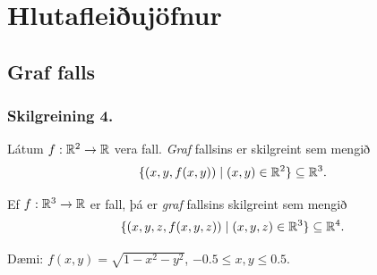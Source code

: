 
\theoremstyle{definition}
\newtheorem{exercise}[theorem]{}





\newbox\mytempbox
\newdimen\mytempdimen

\newcommand\includegraphicscopyright[3][]{%
  \leavevmode\vbox{\vskip3pt\raggedright\setbox\mytempbox=\hbox{\texttt{[image: \#2]}}%
    \mytempdimen=\wd\mytempbox\box\mytempbox\par\vskip1pt%
    \fontsize{3}{3.5}\selectfont{\color{black!25}{\vbox{\hsize=\mytempdimen#3}}}\vskip3pt%
}}

\newenvironment{colortabular}[1]{\medskip\rowcolors[]{1}{blue!20}{blue!10}\tabular{#1}\rowcolor{blue!40}}{\endtabular\medskip}

\def\equad{\leavevmode\hbox{}\quad}

\newenvironment{greencolortabular}[1]
{\medskip\rowcolors[]{1}{green!50!black!20}{green!50!black!10}%
  \tabular{#1}\rowcolor{green!50!black!40}}%
{\endtabular\medskip}





\section{Hlutafleiðujöfnur}


\subsection{Graf falls} 

\subsubsection{Skilgreining 4.}
Látum $f:{\mathbb R}^2\rightarrow {\mathbb R}$ vera fall.  {\em Graf} fallsins er skilgreint sem mengið 
$$\{(x,y,f(x,y))\mid (x,y)\in{\mathbb R}^2\}\subseteq {\mathbb R}^3.$$

Ef $f:{\mathbb R}^3\rightarrow {\mathbb R}$ er fall, þá er  {\em graf} fallsins skilgreint sem mengið 
$$\{(x,y,z,f(x,y,z))\mid (x,y,z)\in{\mathbb R}^3\}\subseteq {\mathbb R}^4.$$

            
 Dæmi: $f(x,y) = \sqrt{1-x^2-y^2}$, $-0.5\leq x,y\leq 0.5$.         

